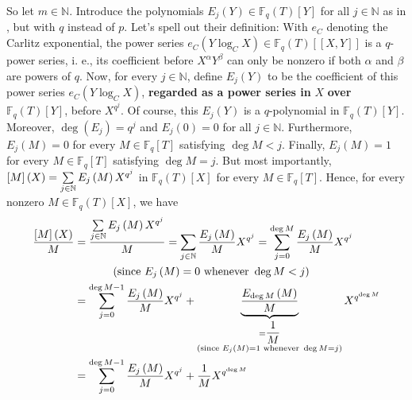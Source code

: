 \documentclass[numbers=enddot,12pt,final,onecolumn,notitlepage]{scrartcl}%
\theoremstyle{definition}
\let\sumnonlimits\sum
\renewcommand{\sum}{\sumnonlimits\limits}
\begin{document}
So let $m\in\mathbb{N}$. Introduce the polynomials $E_{j}\left(  Y\right)
\in\mathbb{F}_{q}\left(  T\right)  \left[  Y\right]  $ for all $j\in
\mathbb{N}$ as in \cite[Section 7]{kc-carlitz}, but with $q$ instead of $p$.
Let's spell out their definition: With $e_{C}$ denoting the Carlitz
exponential, the power series $e_{C}\left(  Y\log_{C}X\right)  \in
\mathbb{F}_{q}\left(  T\right)  \left[  \left[  X,Y\right]  \right]  $ is a
$q$-power series, i. e., its coefficient before $X^{\alpha}Y^{\beta}$ can only
be nonzero if both $\alpha$ and $\beta$ are powers of $q$. Now, for every
$j\in\mathbb{N}$, define $E_{j}\left(  Y\right)  $ to be the coefficient of
this power series $e_{C}\left(  Y\log_{C}X\right)  $, \textbf{regarded as a
power series in }$X$ \textbf{over }$\mathbb{F}_{q}\left(  T\right)  \left[
Y\right]  $, before $X^{q^{j}}$. Of course, this $E_{j}\left(  Y\right)  $ is
a $q$-polynomial in $\mathbb{F}_{q}\left(  T\right)  \left[  Y\right]  $.
Moreover, $\deg\left(  E_{j}\right)  =q^{j}$ and $E_{j}\left(  0\right)  =0$
for all $j\in\mathbb{N}$. Furthermore, $E_{j}\left(  M\right)  =0$ for every
$M\in\mathbb{F}_{q}\left[  T\right]  $ satisfying $\deg M<j$. Finally,
$E_{j}\left(  M\right)  =1$ for every $M\in\mathbb{F}_{q}\left[  T\right]  $
satisfying $\deg M=j$. But most importantly, $\left[  M\right]  \left(
X\right)  =\sum\limits_{j\in\mathbb{N}}E_{j}\left(  M\right)  X^{q^{j}}$ in
$\mathbb{F}_{q}\left(  T\right)  \left[  X\right]  $ for every $M\in
\mathbb{F}_{q}\left[  T\right]  $. Hence, for every nonzero $M\in
\mathbb{F}_{q}\left(  T\right)  \left[  X\right]  $, we have%
\begin{align}
\dfrac{\left[  M\right]  \left(  X\right)  }{M}  &  =\dfrac{\sum
\limits_{j\in\mathbb{N}}E_{j}\left(  M\right)  X^{q^{j}}}{M}=\sum
\limits_{j\in\mathbb{N}}\dfrac{E_{j}\left(  M\right)  }{M}X^{q^{j}}%
=\sum\limits_{j=0}^{\deg M}\dfrac{E_{j}\left(  M\right)  }{M}X^{q^{j}%
}\nonumber\\
&  \ \ \ \ \ \ \ \ \ \ \left(  \text{since }E_{j}\left(  M\right)  =0\text{
whenever }\deg M<j\right) \nonumber\\
&  =\sum\limits_{j=0}^{\deg M-1}\dfrac{E_{j}\left(  M\right)  }{M}X^{q^{j}%
}+\underbrace{\dfrac{E_{\deg M}\left(  M\right)  }{M}}_{\substack{=\dfrac
{1}{M}\\\text{(since }E_{j}\left(  M\right)  =1\text{ whenever }\deg
M=j\text{)}}}X^{q^{\deg M}}\nonumber\\
&  =\sum\limits_{j=0}^{\deg M-1}\dfrac{E_{j}\left(  M\right)  }{M}X^{q^{j}%
}+\dfrac{1}{M}X^{q^{\deg M}} \label{pf.carlitzlog.lem2.5}%
\end{align}
\end{document}

